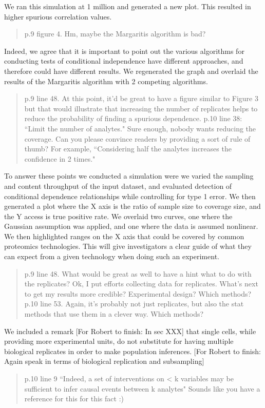 \documentclass{letter}[11]
\def\todo#1{{\color{red}[For Robert to finish: #1]}}
\def\r#1{{\begin{quote}\textsf{\color{blue} #1}\end{quote}}}
\begin{document}
We ran this simulation at 1 million and generated a new plot.  This resulted in higher spurious correlation values.

\r{p.9 figure 4. Hm, maybe the Margaritis algorithm is bad?}

Indeed, we agree that it is important to point out the various algorithms for conducting tests of conditional independence have different approaches, and therefore could have different results.  We regenerated the graph and overlaid the results of the Margaritis algorithm with 2 competing algorithms. 

\r{p.9 line 48. At this point, it'd be great to have a figure similar to Figure 3 but that would illustrate that increasing the number of replicates helps to reduce the probability of finding a spurious dependence. p.10 line 38: ``Limit the number of analytes." Sure enough, nobody wants reducing the coverage. Can you please convince readers by providing a sort of rule of thumb? For example, ``Considering half the analytes increases the confidence in 2 times."}

To answer these points we conducted a simulation were we varied the sampling and content throughput of the input dataset, and evaluated detection of conditional dependence relationships while controlling for type 1 error.  We then generated a plot where the X axis is the ratio of sample size to coverage size, and the Y access is true positive rate.  We overlaid two curves, one where the Gaussian assumption was applied, and one where the data is assumed nonlinear.  We then highlighted ranges on the X axis that could be covered by common proteomics technologies.  This will give investigators a clear guide of what they can expect from a given technology when doing such an experiment.

\r{p.9 line 48.  What would be great as well to have a hint what to do with the replicates? Ok, I put efforts collecting data for replicates. What's next to get my results more credible? Experimental design? Which methods?  p.10 line 53. Again, it's probably not just replicates, but also the stat methods that use them in a clever way. Which methods?}

We included a remark \todo{In sec XXX} that single cells, while providing more experimental units, do not substitute for having multiple biological replicates in order to make population inferences. \todo{Again speak in terms of biological replication and subsampling}

\r{p.10 line 9 ``Indeed, a set of interventions on < k variables may be sufficient to infer causal events between k analytes" Sounds like you have a reference for this for this fact :)}
\end{document}
